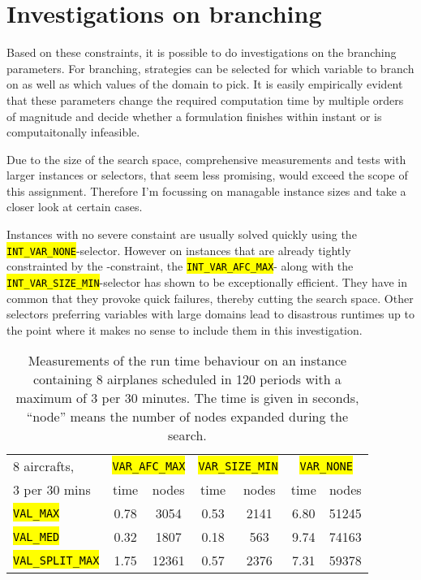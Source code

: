 \documentclass[,%
			paper=a4,%
			DIV12,
			liststotoc,
			bibtotoc,
			draft=false,%
			numbers=noendperiod
			]{scrartcl}
\newcommand{\ilc}[1]{\hl{\texttt{#1}}}
\newcommand{\mymarginnote}[1]{\marginnote{\footnotesize{#1}}}
\begin{document}
\section{Investigations on branching}
Based on these constraints, it is possible to do investigations on the branching parameters. 
For branching, strategies can be selected for which variable to branch on as well as which values of the domain to pick.
It is easily empirically evident that these parameters change the required computation time by multiple orders of magnitude and decide whether a formulation finishes within instant or is computaitonally infeasible.

Due to the size of the search space, comprehensive measurements and tests with larger instances or selectors, that seem less promising, would exceed the scope of this assignment. Therefore I'm focussing on managable instance sizes and take a closer look at certain cases.

Instances with no severe constaint are usually solved quickly using the \ilc{INT\_VAR\_NONE}-selector.
However on instances that are already tightly constrainted by the \Clandings-constraint, the \ilc{INT\_VAR\_AFC\_MAX}- along with the \ilc{INT\_VAR\_SIZE\_MIN}-selector has shown to be exceptionally efficient.
They have in common that they provoke quick failures, thereby cutting the search space. Other selectors preferring variables with large domains lead to disastrous runtimes up to the point where it makes no sense to include them in this investigation.


\begin{table}[htbp]
	\centering
	\begin{tabular}{|p{6.5em}|c|c|c|c|c|c|}
	\hline
		 8 aircrafts,
		 & \multicolumn{2}{c|}{\ilc{VAR\_AFC\_MAX}} &
			\multicolumn{2}{c|}{\ilc{VAR\_SIZE\_MIN}}  &
			\multicolumn{2}{c|}{\ilc{VAR\_NONE}}   \\
	 3 per 30 mins&
	 
	 		time & nodes &
	  	time & nodes &
	    time & nodes \\ \hline

		 \ilc{VAL\_MAX}

		 & 0.78 & 3054
		 & 0.53 & 2141
		 & 6.80 & 51245 

		 \\ \hline
		 \ilc{VAL\_MED}

		 & 0.32 & 1807
		 & 0.18 & 563
		 & 9.74 & 74163
	
		 
		 \\ \hline
		 \ilc{VAL\_SPLIT\_MAX}

		 & 1.75 & 12361
		 & 0.57 & 2376
		 & 7.31 & 59378 \\ \hline

	 
\end{tabular}
\caption{Measurements of the run time behaviour on an instance containing 8 airplanes scheduled in 120 periods with a maximum of 3 per 30 minutes. The time is given in seconds, ``node'' means the number of nodes expanded during the search.}
	\label{fig:res1}
\end{table}
\end{document}
